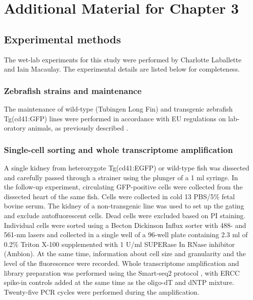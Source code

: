
\chapter{Additional Material for Chapter 3}

\graphicspath{{Appendix2/Figs/}}

\section{Experimental methods} \label{sec:zebrafish-methods}

The wet-lab experiments for this study were performed by Charlotte Laballette and Iain Macaulay. The experimental details are listed below for completeness.

\subsection{Zebrafish strains and maintenance}

The maintenance of wild-type (Tubingen Long Fin) and transgenic zebrafish Tg(cd41:GFP) lines were performed in accordance with EU regulations on lab- oratory animals, as previously described \cite{Bielczyk-Maczynska2014-hf}.

\subsection{Single-cell sorting and whole transcriptome amplification}

A single kidney from heterozygote Tg(cd41:EGFP) or wild-type fish was dissected and carefully passed through a strainer using the plunger of a 1 ml syringe. In the follow-up experiment, circulating GFP-positive cells were collected from the dissected heart of the same fish. Cells were collected in cold 13 PBS/5\% fetal bovine serum. The kidney of a non-transgenic line was used to set up the gating and exclude autofluorescent cells. Dead cells were excluded based on PI staining. Individual cells were sorted using a Becton Dickinson Influx sorter with 488- and 561-nm lasers \cite{Schulte2015-dh} and collected in a single well of a 96-well plate containing 2.3 ml of 0.2\% Triton X-100 supplemented with 1 U/ml SUPERase In RNase inhibitor (Ambion). At the same time, information about cell size and granularity and the level of the fluorescence were recorded. Whole transcriptome amplification and library preparation was performed using the Smart-seq2 protocol  \cite{Picelli2013-px, Picelli2014-hr}, with ERCC spike-in controls added at the same time as the oligo-dT and dNTP mixture. Twenty-five PCR cycles were performed during the amplification.

